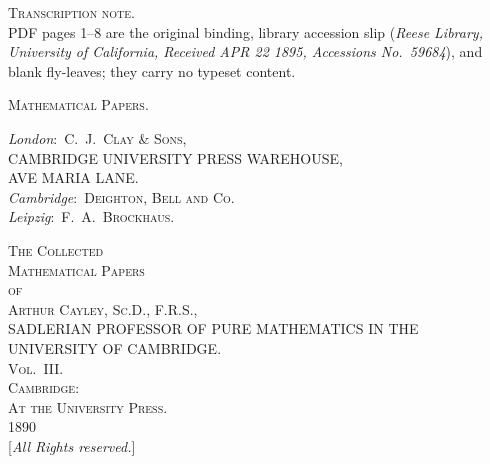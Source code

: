 \documentclass[11pt]{article}
\begin{document}

\begin{center}
\vspace*{2cm}
{\large\textsc{Transcription note.}}\\[1em]
PDF pages 1--8 are the original binding, library accession slip
(\textit{Reese Library, University of California, Received APR 22 1895, Accessions No.\ 59684}),
and blank fly-leaves; they carry no typeset content.
\end{center}

\newpage

\thispagestyle{empty}
\vspace*{8cm}
\begin{center}
{\Large\scshape Mathematical Papers.}
\end{center}
\newpage

\thispagestyle{empty}
\vspace*{8cm}
\begin{center}
\textit{London}:\, \textsc{C.~J.~Clay \& Sons,}\\
{\small CAMBRIDGE UNIVERSITY PRESS WAREHOUSE,}\\
{\small AVE MARIA LANE.}\\[2em]
\textit{Cambridge}:\, \textsc{Deighton, Bell and Co.}\\
\textit{Leipzig}:\, \textsc{F.~A.~Brockhaus.}
\end{center}
\newpage

\thispagestyle{empty}
\begin{center}
\vspace*{2cm}
{\Large\scshape The Collected}\\[1.5em]
{\Huge\scshape Mathematical Papers}\\[1.5em]
{\large\textsc{of}}\\[1.5em]
{\LARGE\scshape Arthur Cayley, Sc.D., F.R.S.,}\\[0.6em]
{\footnotesize SADLERIAN PROFESSOR OF PURE MATHEMATICS IN THE UNIVERSITY OF CAMBRIDGE.}\\[3em]
{\Large\scshape Vol.\ III.}\\[5em]
{\large\scshape Cambridge:}\\
{\normalsize\scshape At the University Press.}\\[0.5em]
{\small 1890}\\[1em]
{\footnotesize [\textit{All Rights reserved.}]}
\end{center}
\newpage
\end{document}
